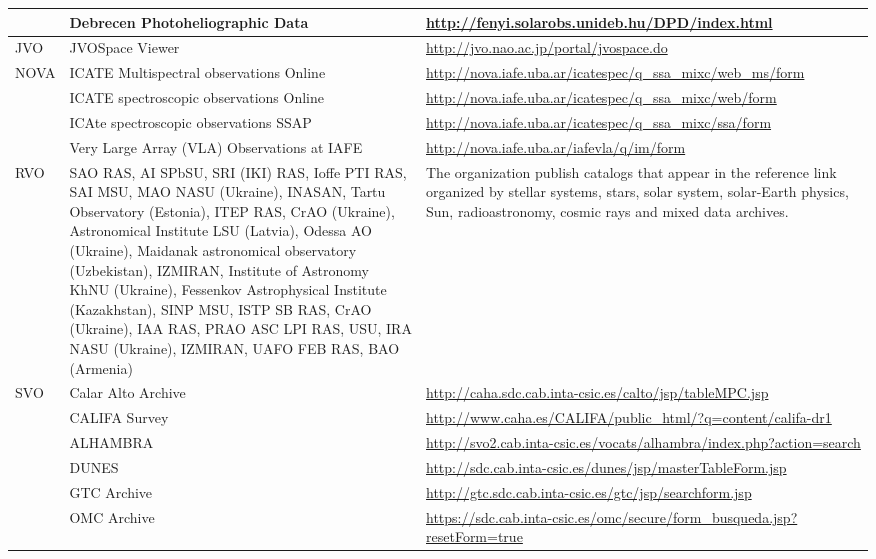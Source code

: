 \begin{table*}[h!t]
\begin{tabular}{|l|p{9cm}|p{6cm}|}
    \cline{2-3}
     & Debrecen Photoheliographic Data
     & \url{http://fenyi.solarobs.unideb.hu/DPD/index.html} \\
     \hline
    JVO & JVOSpace Viewer
    & \url{http://jvo.nao.ac.jp/portal/jvospace.do} \\
    \hline
    \multirow{4}{*}{NOVA} & ICATE Multispectral observations Online 
    & \url{http://nova.iafe.uba.ar/icatespec/q_ssa_mixc/web_ms/form} \\
    \cline{2-3}
     & ICATE spectroscopic observations Online
     & \url{http://nova.iafe.uba.ar/icatespec/q_ssa_mixc/web/form} \\
     \cline{2-3}
     & ICAte spectroscopic observations SSAP
     & \url{http://nova.iafe.uba.ar/icatespec/q_ssa_mixc/ssa/form} \\
     \cline{2-3}
     & Very Large Array (VLA) Observations at IAFE 
     & \url{http://nova.iafe.uba.ar/iafevla/q/im/form} \\
     \hline
   RVO \cite{website:rvo-resources} & SAO RAS, AI SPbSU, SRI (IKI) RAS, Ioffe
   PTI RAS, SAI MSU, MAO NASU (Ukraine), INASAN, Tartu Observatory (Estonia),
   ITEP RAS, CrAO (Ukraine), Astronomical Institute LSU (Latvia), Odessa AO
   (Ukraine), Maidanak astronomical observatory (Uzbekistan), IZMIRAN, Institute
   of Astronomy KhNU (Ukraine), Fessenkov Astrophysical Institute (Kazakhstan),
   SINP MSU, ISTP SB RAS, CrAO (Ukraine), IAA RAS, PRAO ASC LPI RAS, USU, IRA
   NASU (Ukraine), IZMIRAN, UAFO FEB RAS, BAO (Armenia) & The organization
   publish catalogs that appear in the reference link organized by stellar
   systems, stars, solar system, solar-Earth physics, Sun, radioastronomy,
   cosmic rays and mixed data archives. \\
   \hline
   \multirow{14}{*}{SVO} & Calar Alto Archive
   & \url{http://caha.sdc.cab.inta-csic.es/calto/jsp/tableMPC.jsp} \\
   \cline{2-3}
    & CALIFA Survey
    & \url{http://www.caha.es/CALIFA/public_html/?q=content/califa-dr1} \\
    \cline{2-3}
    & ALHAMBRA
    & \url{http://svo2.cab.inta-csic.es/vocats/alhambra/index.php?action=search} \\
    \cline{2-3}
    & DUNES
    & \url{http://sdc.cab.inta-csic.es/dunes/jsp/masterTableForm.jsp} \\
    \cline{2-3}
    & GTC Archive
    & \url{http://gtc.sdc.cab.inta-csic.es/gtc/jsp/searchform.jsp} \\
    \cline{2-3}
    & OMC Archive
    &
    \url{https://sdc.cab.inta-csic.es/omc/secure/form_busqueda.jsp?resetForm=true}

\end{tabular}
\end{table*}
